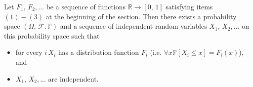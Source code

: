 \documentclass[a4paper]{extarticle}
\begin{document}
\begin{tbox}
    Let \(F_1, \, F_2,...\) be a sequence of functions \(\mathbb{R} \to [0, \, 1]\) satisfying items \((1)-(3)\) at the beginning of the section. Then there exists a probability space \((\Omega, \, \mathcal{F}. \, \mathbb{P})\) and a sequence of independent random variables \(X_1, \, X_2,...\) on this probability space such that
    \begin{itemize}
        \item for every \(i \, X_i\) has a distribution function \(F_i\) (i.e. \(\forall x \mathbb{P}[X_i \leq x] = F_i(x)\)), and
        \item \(X_1, \, X_2,...\) are independent.
    \end{itemize}
\end{tbox}
\end{document}
